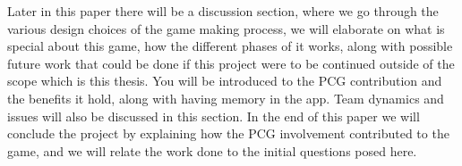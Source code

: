 Later in this paper there will be a discussion section, where we go through the various design choices of the game making process, we will elaborate on what is special about this game, how the different phases of it works, along with possible future work that could be done if this project were to be continued outside of the scope which is this thesis. You will be introduced to the PCG contribution and the benefits it hold, along with having memory in the app. Team dynamics and issues will also be discussed in this section.
In the end of this paper we will conclude the project by explaining how the PCG involvement contributed to the game, and we will relate the work done to the initial questions posed here.